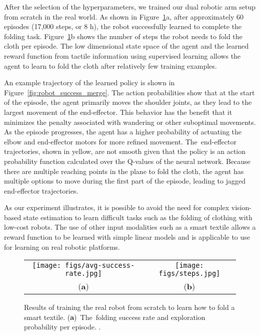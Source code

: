 \documentclass[applsci,article,accept,moreauthors,pdftex]{Definitions/mdpi}
\begin{document}
After the selection of the hyperparameters, we trained our dual robotic arm setup from scratch in the real world. As shown in Figure~\ref{fig:results}a, after approximately $60$ episodes (17,000 steps, or $8$ h), the robot successfully learned to complete the folding task. Figure~\ref{fig:results}b shows the number of steps the robot needs to fold the cloth per episode. The low dimensional state space of the agent and the learned reward function from tactile information using supervised learning allows the agent to learn to fold the cloth after relatively few training examples.

An example trajectory of the learned policy is shown in Figure~\ref{fig:robot_success_merge}. The action probabilities show that at the start of the episode, the agent primarily moves the shoulder joints, as they lead to the largest movement of the end-effector. This behavior has the benefit that it minimizes the penalty associated with wandering or other suboptimal movements. As the episode progresses, the agent has a higher probability of actuating the elbow and end-effector motors for more refined movement. The~end-effector trajectories, shown in yellow, are not smooth given that the policy is an action probability function calculated over the Q-values of the neural network. Because there are multiple reaching points in the plane to fold the cloth, the agent has multiple options to move during the first part of the episode, leading to jagged end-effector trajectories.

As our experiment illustrates, it is possible to avoid the need for complex vision-based state estimation to learn difficult tasks such as the folding of clothing with low-cost robots. The use of other input modalities such as a smart textile allows a reward function to be learned with simple linear models and is applicable to use for learning on real robotic platforms.
\begin{figure}[H]
\centering
\begin{tabular}{cc}
\texttt{[image: figs/avg-success-rate.jpg]}
&\texttt{[image: figs/steps.jpg]}\\
({\bf a})&({\bf b})\\
\end{tabular}
\caption{Results of training the real robot from scratch to learn how to fold a smart textile. (\textbf{a})~The~folding success rate and exploration probability per episode. .}
\label{fig:results}
\end{figure}
\unskip
\end{document}
